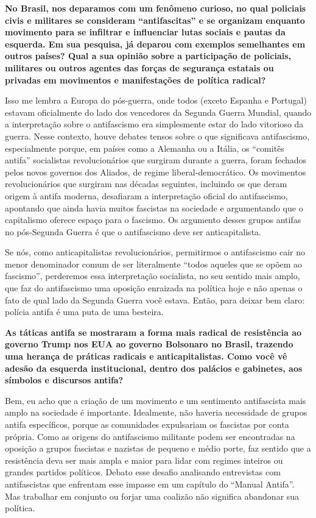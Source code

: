 \textbf{No Brasil, nos deparamos com um fenômeno curioso, no qual policiais civis e militares se consideram “antifascitas” e se organizam enquanto movimento para se infiltrar e influenciar lutas sociais e pautas da esquerda. Em sua pesquisa, já deparou com exemplos semelhantes em outros países? Qual a sua opinião sobre a participação de policiais, militares ou outros agentes das forças de segurança estatais ou privadas em movimentos e manifestações de política radical?}
 
Isso me lembra a Europa do pós-guerra, onde todos (exceto Espanha e Portugal) estavam oficialmente do lado dos vencedores da Segunda Guerra Mundial, quando a interpretação sobre o antifascismo era simplesmente estar do lado vitorioso da guerra. Nesse contexto, houve debates tensos sobre o que significava antifascismo, especialmente porque, em países como a Alemanha ou a Itália, os “comitês antifa” socialistas revolucionários que surgiram durante a guerra, foram fechados pelos novos governos dos Aliados, de regime liberal-democrático. Os movimentos revolucionários que surgiram nas décadas seguintes, incluindo os que deram origem à antifa moderna, desafiaram a interpretação oficial do antifascismo, apontando que ainda havia muitos fascistas na sociedade e argumentando que o capitalismo oferece espaço para o fascismo. Os argumento desses grupos antifas no pós-Segunda Guerra é que o antifascismo deve ser anticapitalista. 
 
Se nós, como anticapitalistas revolucionários, permitirmos o antifascismo cair no menor denominador comum de ser literalmente “todos aqueles que se opõem ao fascismo”, perderemos essa interpretação socialista, no seu sentido mais amplo, que faz do antifascismo uma oposição enraizada na política hoje e não apenas o fato de qual lado da Segunda Guerra você estava. Então, para deixar bem claro: polícia antifa é uma puta de uma besteira. 

\textbf{As táticas antifa se mostraram a forma mais radical de resistência ao governo Trump nos EUA ao governo Bolsonaro no Brasil, trazendo uma herança de práticas radicais e anticapitalistas. Como você vê adesão da esquerda institucional, dentro dos palácios e gabinetes, aos símbolos e discursos antifa?}
 
Bem, eu acho que a criação de um movimento e um sentimento antifascista mais amplo na sociedade é importante. Idealmente, não haveria necessidade de grupos antifa específicos, porque as comunidades expulsariam os fascistas por conta própria. Como as origens do antifascismo militante podem ser encontradas na oposição a grupos fascistas e nazistas de pequeno e médio porte, faz sentido que a resistência deva ser mais ampla e maior para lidar com regimes inteiros ou grandes partidos políticos. Debato esse desafio analisando entrevistas com antifascistas que enfrentam esse impasse em um capítulo do “Manual Antifa”. Mas trabalhar em conjunto ou forjar uma coalizão não significa abandonar sua política. 
 
